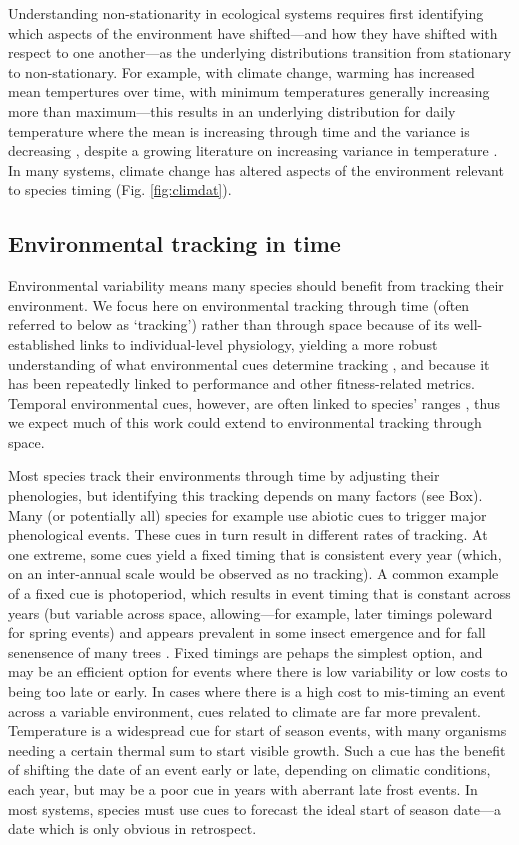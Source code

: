 \documentclass[11pt,letterpaper]{article}
\begin{document}
Understanding non-stationarity in ecological systems requires first identifying which aspects of the environment have shifted---and how they have shifted with respect to one another---as the underlying distributions transition from stationary to non-stationary. For example, with climate change, warming has increased mean tempertures over time, with minimum temperatures generally increasing more than maximum---this results in an underlying distribution for daily temperature where the mean is increasing through time and the variance is decreasing \citep{ipcc2013,screen2014}, despite a growing literature on increasing variance in temperature \citep[e.g.,][]{vasseur2014}. In many systems, climate change has altered aspects of the environment relevant to species timing (Fig. \ref{fig:climdat}).

\subsection{Environmental tracking in time}

Environmental variability means many species should benefit from tracking their environment. We focus here on environmental tracking through time (often referred to below as `tracking') rather than through space because of its well-established links to individual-level physiology, yielding a more robust understanding of what environmental cues determine tracking \citep{chuineJTB,Chew:2012pd}, and because it has been repeatedly linked to performance and other fitness-related metrics. Temporal environmental cues, however, are often linked to species' ranges \citep{Morin:2008vp,arabid2011}, thus we expect much of this work could extend to environmental tracking through space. 

Most species track their environments through time by adjusting their phenologies, but identifying this tracking depends on many factors (see Box). Many (or potentially all) species for example use abiotic cues to trigger major phenological events. These cues in turn result in different rates of tracking. At one extreme, some cues yield a fixed timing that is consistent every year (which, on an inter-annual scale would be observed as no tracking). A common example of a fixed cue is photoperiod, which results in event timing that is constant across years (but variable across space, allowing---for example, later timings poleward for spring events) and appears prevalent in some insect emergence and for fall senensence of many trees \citep{Denlinger2017,lechowiczbook2002}. Fixed timings are pehaps the simplest option, and may be an efficient option for events where there is low variability or low costs to being too late or early. In cases where there is a high cost to mis-timing an event across a variable environment, cues related to climate are far more prevalent. Temperature is a widespread cue for start of season events, with many organisms needing a certain thermal sum to start visible growth. Such a cue has the benefit of shifting the date of an event early or late, depending on climatic conditions, each year, but may be a poor cue in years with aberrant late frost events. In most systems, species must use cues to forecast the ideal start of season date---a date which is only obvious in retrospect. 
\end{document}
